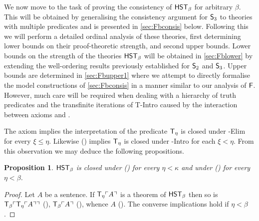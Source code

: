 \documentclass[UKenglish,cleveref,DIV=12]{scrartcl}
\newtheorem{proposition}[lemma]{Proposition}
\theoremstyle{definition}
\theoremstyle{definition}
\begin{document}
We now move to the task of proving the consistency of $\mathsf{HST}_\beta$ for arbitrary
$\beta$. This will be obtained by generalising the consistency argument for
$\mathsf{S}_3$ to theories with multiple predicates and is presented in
\cref{sec:Fbconsis} below. Following this we will perform a detailed ordinal
analysis of these theories, first determining lower bounds on their
proof-theoretic strength, and second upper bounds. Lower bounds on the strength
of the theories $\mathsf{HST}_\beta$ will be obtained in \cref{sec:Fblower} by
extending the well-ordering results previously established for $\mathsf{S}_2$ and
$\mathsf{S}_3$. Upper bounds are determined in \cref{sec:Fbupper1} where we
attempt to directly formalise the model constructions of \cref{sec:Fbconsis}
in a manner similar to our analysis of $\mathsf{F}$. However, much care will be required when
dealing with a hierarchy of truth predicates and the transfinite iterations of
T-Intro caused by the interaction between axioms \Uni\eta and \Rep\eta.

The axiom \Del\eta implies the interpretation of the predicate $\mathsf{T}_\eta$ is closed under \textT\xi-Elim for every $\xi\le\eta$. Likewise (\Rep\eta) implies $\mathsf{T}_\eta$ is closed under \textT\xi-Intro for each $\xi<\eta$. 
From this observation we may deduce the following propositions. %

\begin{proposition}\label{nec-and-conec}
	$\mathsf{HST}_\beta$ is closed under (\Conec\eta) for every \( \eta < \kappa \) and under (\Nec\eta) for every $\eta<\beta$.
\end{proposition}
\begin{proof}
	Let \( A \) be a sentence.
	If \( \mathsf{T}_\eta \ulcorner{A}\urcorner \) is a theorem of \( \mathsf{HST}_\beta \) then so is \( \mathsf{T}_\beta\ulcorner{ \mathsf{T}_\eta \ulcorner{A}\urcorner }\urcorner \) (\Nec\beta), \( \mathsf{T}_\beta \ulcorner{A}\urcorner \) (\Del\beta), whence \( A \) (\Conec{\beta}).
	The converse implications hold if \( \eta < \beta \).
\end{proof}
\end{document}
